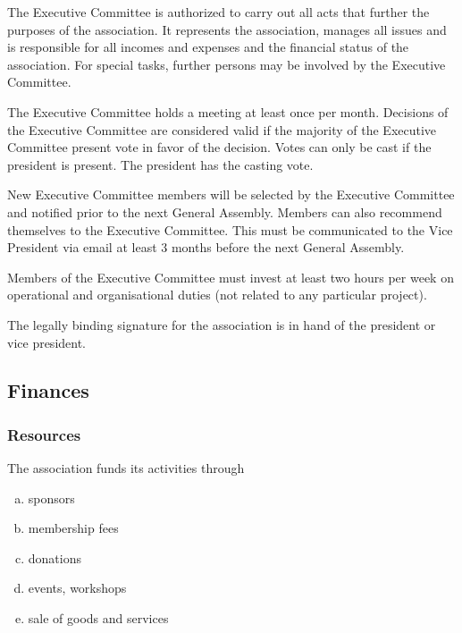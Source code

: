 \documentclass[12pt,a4paper,oneside]{article}
\newcounter{art}
\newcommand{\english}{    \switchcolumn[0]\noindent}
\begin{document}
\begin{paracol}{2}
	The Executive Committee is authorized to carry out all acts that further the purposes of the association. It represents the association, manages all issues and is responsible for all incomes and expenses and the financial status of the association. For special tasks, further persons may be involved by the Executive Committee. 

	The Executive Committee holds a meeting at least once per month. 
	Decisions of the Executive Committee are considered valid if the majority of the Executive Committee present vote in favor of the decision. Votes can only be cast if the president is present. The president has the casting vote.

	New Executive Committee members will be selected by the Executive Committee and notified prior to the next General Assembly. Members can also recommend themselves to the Executive Committee. This must be communicated to the Vice President via email at least 3 months before the next General Assembly.

	Members of the Executive Committee must invest at least two hours per week on operational and organisational duties (not related to any particular project).

	The legally binding signature for the association is in hand of the president or vice president.
 



\english
	\subsection{Finances}


\english
	\subsubsection{Resources}
	The association funds its activities through 

	\begin{enumerate}[(a)]
	\item sponsors
	\item membership fees
	\item donations
	\item events, workshops
	\item sale of goods and services
	\end{enumerate}
	\vspace{0.27cm}






\end{paracol}
\end{document}
